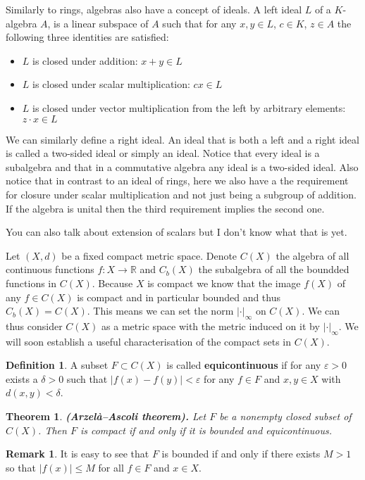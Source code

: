 \documentclass[11pt,a4paper]{article}
\theoremstyle{definition}
\newtheorem{definition}{Definition}[section]
\newtheorem{remark}{Remark}[section]
\theoremstyle{plain}
\newtheorem{theorem}{Theorem}[section]
\newcommand{\R}{\mathbb{R}}
\newcommand{\abs}[1]{\left\lvert #1\right\rvert}
\renewcommand{\tt}[1]{\textnormal{\textbf{(#1).}}} %
\begin{document}
  Similarly to rings, algebras also have a concept of ideals. A left ideal
  $L$ of a $K$-algebra $A$, is a linear subspace of $A$ such that for
  any $x,y \in L$, $c \in K$, $z \in A$ the following three identities
  are satisfied:
  \begin{itemize}
    \item $L$ is closed under addition: $x + y \in L$
    \item $L$ is closed under scalar multiplication: $cx \in L$
    \item $L$ is closed under vector multiplication from the left
    by arbitrary elements: $z \cdot x \in L$
  \end{itemize}
  We can similarly define a right ideal. An ideal that is both a left and
  a right ideal is called a two-sided ideal or simply an ideal. Notice
  that every ideal is a subalgebra and that in a commutative algebra
  any ideal is a two-sided ideal. Also notice that in contrast to an
  ideal of rings, here we also have a the requirement for closure under
  scalar multiplication and not just being a subgroup of addition.
  If the algebra is unital then the third requirement implies the second
  one.

  You can also talk about extension of scalars but I don't know what
  that is yet.

  Let $(X,d)$ be a fixed compact metric space. Denote $C(X)$ the algebra
  of all continuous functions $f \colon X \to \R$ and $C_b(X)$ the
  subalgebra of all the boundded functions in $C(X)$. Because $X$
  is compact we know that the image $f(X)$ of any $f \in C(X)$ is compact
  and in particular bounded and thus $C_b(X) = C(X)$. This means we can set 
  the norm $|\cdot|_\infty$ on $C(X)$. We can thus consider $C(X)$ as
  a metric space with the metric induced on it by $|\cdot|_\infty$.
  We will soon establish a useful characterisation of the compact sets
  in $C(X)$.
  \begin{definition}
    A subset $F \subset C(X)$ is called \textbf{equicontinuous} if
    for any $\varepsilon > 0$ exists a $\delta > 0$ such that
    $\abs{f(x) - f(y)} < \varepsilon$ for any $f \in F$ and $x,y \in X$ with
    $d(x,y) < \delta$.
  \end{definition}
  \begin{theorem}
    \tt{Arzelà–Ascoli theorem} Let $F$ be a nonempty closed subset of 
    $C(X)$. Then $F$ is compact if and only if it is bounded and 
    equicontinuous.
  \end{theorem}
  \begin{remark}
    It is easy to see that $F$ is bounded if and only if there exists 
    $M > 1$ so that $|f (x)| \le M$ for all $f \in F$ and $x \in X$.
  \end{remark}
   
\end{document}
